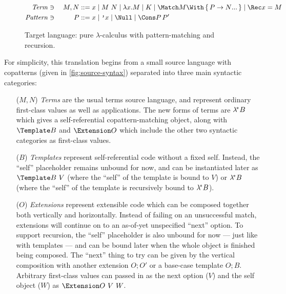 \begin{figure}
\centering
\begin{alignat*}{2}
  \mathit{Term} &\ni{}& M, N
  &::= x
  \mid M ~ N
  \mid \lambda x. M
  \mid K
  \mid \Match M \With \set{\many{P \to N}}
  \mid \Rec x = M
  \\
  \mathit{Pattern} &\ni{}& P
  &::= x
  \mid \q{x}
  \mid \Null
  \mid \Cons P \, P'
\end{alignat*}

\caption{Target language: pure $\lambda$-calculus with pattern-matching and recursion.}
\label{fig:target-syntax}
\end{figure}

For simplicity, this translation begins from a small source language with copatterns (given in \cref{fig:source-syntax}) separated into three main syntactic categories:
\begin{itemize}
\item[($M, N$)] \emph{Terms} are the usual terms source language, and represent ordinary first-class values as well as applications.
  The new forms of terms are $\lambda^{\!*} B$ which gives a self-referential copattern-matching object, along with $\Template B$ and $\Extension O$ which include the other two syntactic categories as first-class values.
\item[($B$)] \emph{Templates} represent self-referential code without a fixed self.
  Instead, the ``self'' placeholder remains unbound for now, and can be instantiated later as $\Template B ~ V$ (where the ``self'' of the template is bound to $V$) or $\lambda^{\!*} B$ (where the ``self'' of the template is recursively bound to $\lambda^{\!*} B$).
\item[($O$)] \emph{Extensions} represent extensible code which can be composed together both vertically and horizontally.
  Instead of failing on an unsuccessful match, extensions will continue on to an as-of-yet unspecified ``next'' option.
  To support recursion, the ``self'' placeholder is also unbound for now --- just like with templates --- and can be bound later when the whole object is finished being composed.
  The ``next'' thing to try can be given by the vertical composition with another extension $O; O'$ or a base-case template $O; B$.
  Arbitrary first-class values can passed in as the next option ($V$) and the self object ($W$) as $\Extension O ~ V ~ W$.
\end{itemize}

